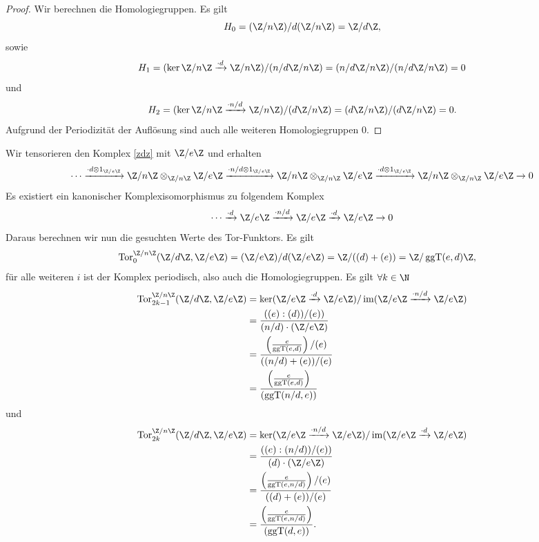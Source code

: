 \documentclass{article}
\newcommand{\im}{\operatorname{im}}
\newcommand{\ggt}{\operatorname{ggT}}
\newcommand{\tor}{\operatorname{Tor}}
\begin{document}
\begin{enumerate}[(a)]
\begin{enumerate}[1)]
          \begin{proof}
          	Wir berechnen die Homologiegruppen.
          	Es gilt
          	\[
          		H_0 = (\Z/n\Z) / d(\Z/n\Z) = \Z/d\Z,
          	\]
          	sowie
          	\[
          		H_1 = (\ker \Z/n\Z \xrightarrow{\cdot d} \Z/n\Z)/(n/d\Z/n\Z) = (n/d\Z/n\Z)/(n/d\Z/n\Z) = 0
          	\]
          	und
          	\[
          		H_2 = (\ker \Z/n\Z \xrightarrow{\cdot n/d} \Z/n\Z)/(d\Z/n\Z) = (d\Z/n\Z)/(d\Z/n\Z) = 0.
          	\]
          	Aufgrund der Periodizität der Auflösung sind auch alle weiteren Homologiegruppen 0.
          \end{proof}
      	Wir tensorieren den Komplex \ref{zdz} mit $\Z/e\Z$ und erhalten 
      	 \begin{equation}
      		\cdots \xrightarrow{\cdot d\otimes 1_{\Z/e\Z}} \Z/n\Z\otimes_{\Z/n\Z} \Z/e\Z \xrightarrow{\cdot n/d\otimes 1_{\Z/e\Z}} \Z/n\Z \otimes_{\Z/n\Z} \Z/e\Z \xrightarrow{\cdot d\otimes 1_{\Z/e\Z}} \Z/n\Z \otimes_{\Z/n\Z} \Z/e\Z \to 0\label{zdzez}
      	\end{equation}
      Es existiert ein kanonischer Komplexisomorphismus zu folgendem Komplex
       \begin{equation}
      	\cdots \xrightarrow{\cdot d} \Z/e\Z \xrightarrow{\cdot n/d} \Z/e\Z \xrightarrow{\cdot d} \Z/e\Z \to 0\label{zez}
      \end{equation}
  	Daraus berechnen wir nun die gesuchten Werte des Tor-Funktors.
  	Es gilt
  	\begin{align*}
  		\tor_0^{\Z/n\Z}(\Z/d\Z, \Z/e\Z) &= (\Z/e\Z)/d(\Z/e\Z) = \Z/((d) + (e)) = \Z/\ggt(e,d)\Z,
  	\end{align*} für alle weiteren $i$ ist der Komplex periodisch, also auch die Homologiegruppen. Es gilt $\forall k \in \N$
  	\begin{align*}
  		\tor_{2k-1}^{\Z/n\Z}(\Z/d\Z, \Z/e\Z) &= \ker (\Z/e\Z \xrightarrow{\cdot d} \Z/e\Z) / \im (\Z/e\Z \xrightarrow{\cdot n/d} \Z/e\Z)\\
  		&= \frac{((e):(d))/(e))}{(n/d)\cdot (\Z/e\Z)}\\
  		&= \frac{\left(\frac{e}{\ggt(e,d)}\right)/(e)}{((n/d) + (e))/(e)}\\
  		&= \frac{\left(\frac{e}{\ggt(e,d)}\right)}{(\ggt(n/d, e))}
  	\end{align*}
  	 und
  	 \begin{align*}
  	 	\tor_{2k}^{\Z/n\Z}(\Z/d\Z, \Z/e\Z) &= \ker (\Z/e\Z \xrightarrow{\cdot n/d} \Z/e\Z) / \im (\Z/e\Z \xrightarrow{\cdot d} \Z/e\Z)\\
  	 	&= \frac{((e):(n/d))/(e))}{(d)\cdot (\Z/e\Z)}\\
  	 	&= \frac{\left(\frac{e}{\ggt(e,n/d)}\right)/(e)}{((d) + (e))/(e)}\\
  	 	&= \frac{\left(\frac{e}{\ggt(e,n/d)}\right)}{(\ggt(d, e))}.
  	 \end{align*}
          \end{enumerate}
\end{enumerate}
\end{document}
